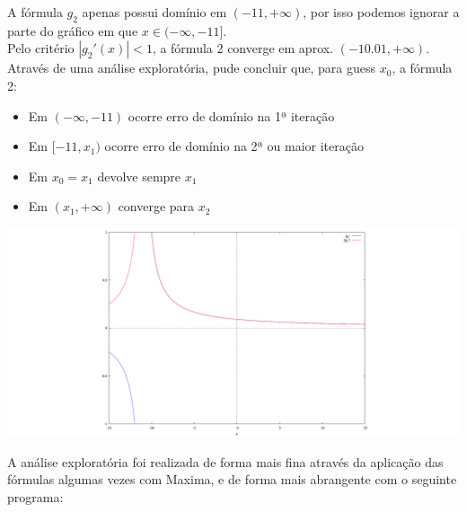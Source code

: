 {A fórmula $g_2$ apenas possui domínio em $(-11,+\infty)$, por isso podemos ignorar a parte do gráfico em que $x \in (-\infty, -11]$.\\
Pelo critério $|g_2'(x)|<1$, a fórmula 2 converge em aprox. $(-10.01, +\infty)$.\\
Através de uma análise exploratória, pude concluir que, para guess $x_0$, a fórmula 2:
\begin{itemize}
	\item Em $(-\infty, -11)$ ocorre erro de domínio na 1ª iteração
	\item Em $[-11,x_1)$ ocorre erro de domínio na 2ª ou maior iteração
	\item Em $x_0=x_1$ devolve sempre $x_1$
	\item Em $(x_1,+\infty)$ converge para $x_2$
\end{itemize}
\begin{center} \includegraphics[scale=0.2,trim={14cm 0 14cm 0},clip]{2019T1_1c2} \end{center}
A análise exploratória foi realizada de forma mais fina através da aplicação das fórmulas algumas vezes com Maxima, e de forma mais abrangente com o seguinte programa:

}
